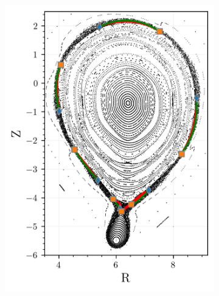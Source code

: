 \begin{figure}[H]
    \centering
    \begin{minipage}[c]{0.55\textwidth} %
        \centering
        \begin{subfigure}[b]{\textwidth}
            \centering
            \includegraphics[width=\textwidth]{images/turnstile/coutour_fwd.png}
            \caption{}
            \label{fig:}
        \end{subfigure}
    \end{minipage}
    \hfill
    \begin{minipage}[c]{0.42\textwidth} %
        \centering
        \begin{subfigure}[b]{0.95\textwidth}
            \centering

\end{subfigure}
\end{minipage}
\end{figure}
